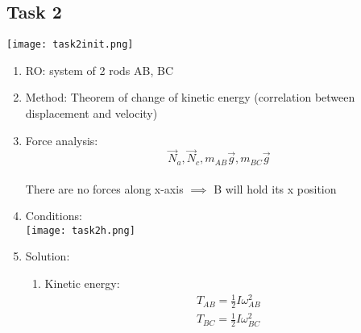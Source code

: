 \subsection*{Task 2}

\texttt{[image: task2init.png]}

\begin{enumerate}
    \item RO: system of 2 rods AB, BC
    \item Method: Theorem of change of kinetic energy (correlation between displacement and velocity)
    \item Force analysis:
          \[\vec{N}_a, \vec{N}_c, m_{AB}\vec{g}, m_{BC}\vec{g} \] \\
          There are no forces along x-axis $\implies$ B will hold its x position
    \item Conditions: \\
          \texttt{[image: task2h.png]}
    \item Solution:
          \begin{enumerate}
              \item Kinetic energy:
                    \begin{align}
                        T_{AB} = \frac{1}{2}I\omega_{AB}^2 \\
                        T_{BC} = \frac{1}{2}I\omega_{BC}^2
                    \end{align}

\end{enumerate}
\end{enumerate}
